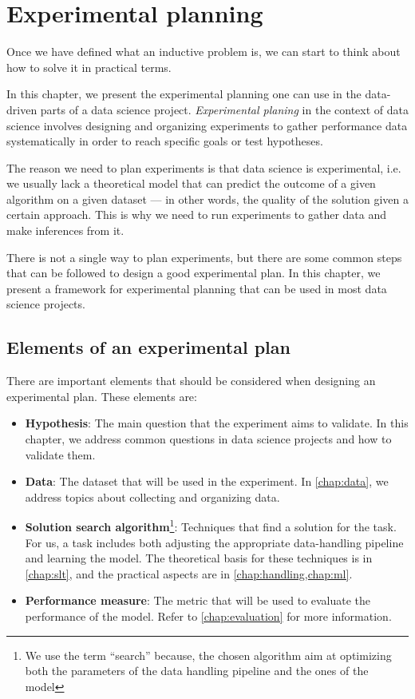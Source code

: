 \chapter{Experimental planning}
\label{chap:planning}


Once we have defined what an inductive problem is, we can start to think about how to
solve it in practical terms.

In this chapter, we present the experimental planning one can use in the data-driven
parts of a data science project.  \emph{Experimental planing}  in the context of data
science involves designing and organizing experiments to gather performance data
systematically in order to reach specific goals or test hypotheses.

The reason we need to plan experiments is that data science is experimental, i.e. we
usually lack a theoretical model that can predict the outcome of a given algorithm on a
given dataset  --- in other words, the quality of the solution given a certain approach.
This is why we need to run experiments to gather data and make
inferences from it.

There is not a single way to plan experiments, but there are some common steps that can
be followed to design a good experimental plan.  In this chapter, we present a
framework for experimental planning that can be used in most data science projects.

\section{Elements of an experimental plan}

There are important elements that should be considered when designing an experimental
plan.  These elements are:
\begin{itemize}
  \item \textbf{Hypothesis}: The main question that the experiment aims to validate.
    In this chapter, we address common questions in data science projects and how to
    validate them.
  \item \textbf{Data}: The dataset that will be used in the experiment.  In
    \cref{chap:data}, we address topics about collecting and organizing data.
  \item \textbf{Solution search algorithm}\footnote{We use the term ``search'' because,
    the chosen algorithm aim at optimizing both the parameters of the data handling
    pipeline and the ones of the model}: Techniques that find a solution for the task.
    For us, a task includes both adjusting the appropriate data-handling
    pipeline and learning the model.  The theoretical basis for these techniques is in
    \cref{chap:slt}, and the practical aspects are in \cref{chap:handling,chap:ml}.
  \item \textbf{Performance measure}: The metric that will be used to evaluate the
    performance of the model.  Refer to \cref{chap:evaluation} for more information.
\end{itemize}

